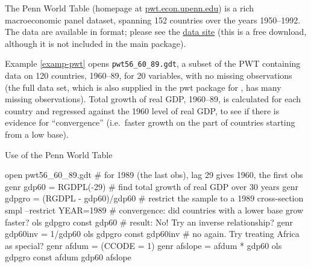The Penn World Table (homepage at
\href{http://pwt.econ.upenn.edu/}{pwt.econ.upenn.edu}) is a rich
macroeconomic panel dataset, spanning 152 countries over the years
1950--1992.  The data are available in  format; please see
the 
\href{http://gretl.sourceforge.net/gretl_data.html}{data site} (this
is a free download, although it is not included in the main
 package).

Example \ref{examp-pwt} opens \verb+pwt56_60_89.gdt+, a subset
of the PWT containing data on 120 countries, 1960--89, for 20
variables, with no missing observations (the full data set, which is
also supplied in the pwt package for , has many missing
observations). Total growth of real GDP, 1960--89, is calculated for
each country and regressed against the 1960 level of real GDP, to see
if there is evidence for ``convergence'' (i.e.\ faster growth on the
part of countries starting from a low base).

\begin{script}[htbp]
  \caption{Use of the Penn World Table}
  \label{examp-pwt}
\begin{code}
          open pwt56_60_89.gdt 
          # for 1989 (the last obs), lag 29 gives 1960, the first obs 
          genr gdp60 = RGDPL(-29) 
          # find total growth of real GDP over 30 years
          genr gdpgro = (RGDPL - gdp60)/gdp60
          # restrict the sample to a 1989 cross-section 
          smpl --restrict YEAR=1989 
          # convergence: did countries with a lower base grow faster?  
          ols gdpgro const gdp60 
          # result: No! Try an inverse relationship?
          genr gdp60inv = 1/gdp60 
          ols gdpgro const gdp60inv 
          # no again.  Try treating Africa as special? 
          genr afdum = (CCODE = 1)
          genr afslope = afdum * gdp60 
          ols gdpgro const afdum gdp60 afslope 
\end{code}
\end{script}



